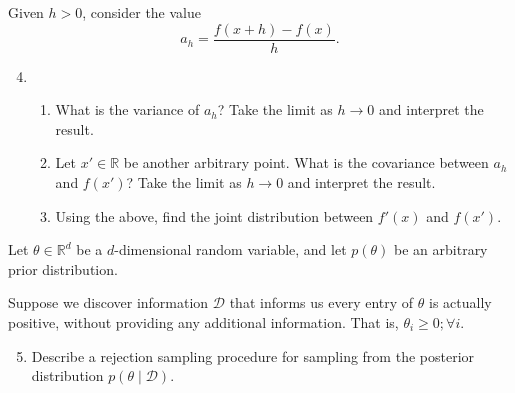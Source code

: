 \documentclass{article}
\newcommand{\given}{\mid}
\newcommand{\mc}[1]{\mathcal{#1}}
\newcommand{\data}{\mc{D}}
\newcommand{\R}{\mathbb{R}}
\begin{document}
Given $h > 0$, consider the value
\[
  a_h = \frac{f(x + h) - f(x)}{h}.
\]
\begin{enumerate}\setcounter{enumi}{3}
\item
  \begin{enumerate}
  \item
    What is the variance of $a_h$? Take the limit as $h \to 0$ and interpret the
    result.
  \item
    Let $x' \in \R$ be another arbitrary point. What is the covariance between
    $a_h$ and $f(x')$? Take the limit as $h \to 0$ and interpret the result.
  \item
    Using the above, find the joint distribution between $f'(x)$ and $f(x')$.
  \end{enumerate}
\end{enumerate}

\clearpage

Let $\theta \in \R^d$ be a $d$-dimensional random variable, and let $p(\theta)$
be an arbitrary prior distribution.

Suppose we discover information $\data$ that informs us every entry of $\theta$
is actually positive, without providing any additional information. That is,
$\theta_i \geq 0; \forall i$.
\begin{enumerate}\setcounter{enumi}{4}
\item
  Describe a rejection sampling procedure for sampling from the posterior
  distribution $p(\theta \given \data)$.
\end{enumerate}
\end{document}
